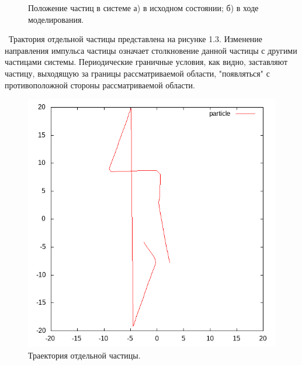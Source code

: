 \documentclass[14pt,a4paper,report]{ncc}
\begin{document}
\begin{figure}[b]
\begin{minipage}[b]{0.5\linewidth}
\end{minipage}
\caption{Положение частиц в системе а) в исходном состоянии; б) в ходе моделирования.}
\end{figure}
 \
Трактория отдельной частицы представлена на рисунке 1.3. Изменение направления импульса частицы означает столкновение данной частицы с другими частицами системы. Периодические граничные условия, как видно, заставляют частицу, выходящую за границы рассматриваемой области, "появляться" с противоположной стороны рассматриваемой области.
\begin{figure}[tbh]
\includegraphics[scale=0.8]{particle}
\caption{Траектория отдельной частицы.}
\end{figure}
 \
 
\end{document}
